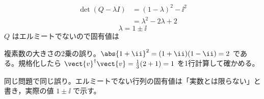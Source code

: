 \begin{align*}
\det(Q-\lambda I)&=(1-\lambda)^{2}-\ii^{2}\\
&=\lambda^{2}-2\lambda+2
\end{align*}
\[ \lambda=1\pm\ii \]
$Q$ はエルミートでないので固有値は
\item {} 複素数の大きさの2乗の誤り。$\abs{1+\ii}^{2}=(1+\ii)(1-\ii)=2$ である。規格化したら $\vect{v}^{\dagger}\vect{v}=\frac{1}{3}(2+1)=1$ を1行計算して確かめる。
\item {} 同じ問題で同じ誤り。エルミートでない行列の固有値は「実数とは限らない」と書き，実際の値 $1\pm\ii$ で示す。
